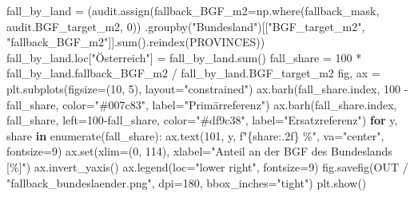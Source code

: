 \documentclass[
  ngerman,
  a4paper,
  DIV=11]{scrreprt}
\newenvironment{Shaded}{\begin{snugshade}}{\end{snugshade}}
\newcommand{\BuiltInTok}[1]{\textcolor[rgb]{0.00,0.23,0.31}{#1}}
\newcommand{\ControlFlowTok}[1]{\textcolor[rgb]{0.00,0.23,0.31}{\textbf{#1}}}
\newcommand{\DecValTok}[1]{\textcolor[rgb]{0.68,0.00,0.00}{#1}}
\newcommand{\KeywordTok}[1]{\textcolor[rgb]{0.00,0.23,0.31}{\textbf{#1}}}
\newcommand{\NormalTok}[1]{\textcolor[rgb]{0.00,0.23,0.31}{#1}}
\newcommand{\OperatorTok}[1]{\textcolor[rgb]{0.37,0.37,0.37}{#1}}
\newcommand{\SpecialCharTok}[1]{\textcolor[rgb]{0.37,0.37,0.37}{#1}}
\newcommand{\SpecialStringTok}[1]{\textcolor[rgb]{0.13,0.47,0.30}{#1}}
\newcommand{\StringTok}[1]{\textcolor[rgb]{0.13,0.47,0.30}{#1}}
\begin{document}
\begin{Shaded}
\begin{Highlighting}[]
\NormalTok{fall\_by\_land }\OperatorTok{=}\NormalTok{ (audit.assign(fallback\_BGF\_m2}\OperatorTok{=}\NormalTok{np.where(fallback\_mask, audit.BGF\_target\_m2, }\DecValTok{0}\NormalTok{))}
\NormalTok{    .groupby(}\StringTok{"Bundesland"}\NormalTok{)[[}\StringTok{"BGF\_target\_m2"}\NormalTok{, }\StringTok{"fallback\_BGF\_m2"}\NormalTok{]].}\BuiltInTok{sum}\NormalTok{().reindex(PROVINCES))}
\NormalTok{fall\_by\_land.loc[}\StringTok{"Österreich"}\NormalTok{] }\OperatorTok{=}\NormalTok{ fall\_by\_land.}\BuiltInTok{sum}\NormalTok{()}
\NormalTok{fall\_share }\OperatorTok{=} \DecValTok{100} \OperatorTok{*}\NormalTok{ fall\_by\_land.fallback\_BGF\_m2 }\OperatorTok{/}\NormalTok{ fall\_by\_land.BGF\_target\_m2}
\NormalTok{fig, ax }\OperatorTok{=}\NormalTok{ plt.subplots(figsize}\OperatorTok{=}\NormalTok{(}\DecValTok{10}\NormalTok{, }\DecValTok{5}\NormalTok{), layout}\OperatorTok{=}\StringTok{"constrained"}\NormalTok{)}
\NormalTok{ax.barh(fall\_share.index, }\DecValTok{100} \OperatorTok{{-}}\NormalTok{ fall\_share, color}\OperatorTok{=}\StringTok{"\#007c83"}\NormalTok{, label}\OperatorTok{=}\StringTok{"Primärreferenz"}\NormalTok{)}
\NormalTok{ax.barh(fall\_share.index, fall\_share, left}\OperatorTok{=}\DecValTok{100}\OperatorTok{{-}}\NormalTok{fall\_share,}
\NormalTok{        color}\OperatorTok{=}\StringTok{"\#df9c38"}\NormalTok{, label}\OperatorTok{=}\StringTok{"Ersatzreferenz"}\NormalTok{)}
\ControlFlowTok{for}\NormalTok{ y, share }\KeywordTok{in} \BuiltInTok{enumerate}\NormalTok{(fall\_share):}
\NormalTok{    ax.text(}\DecValTok{101}\NormalTok{, y, }\SpecialStringTok{f"}\SpecialCharTok{\{}\NormalTok{share}\SpecialCharTok{:.2f\}}\SpecialStringTok{ \%"}\NormalTok{, va}\OperatorTok{=}\StringTok{"center"}\NormalTok{, fontsize}\OperatorTok{=}\DecValTok{9}\NormalTok{)}
\NormalTok{ax.}\BuiltInTok{set}\NormalTok{(xlim}\OperatorTok{=}\NormalTok{(}\DecValTok{0}\NormalTok{, }\DecValTok{114}\NormalTok{), xlabel}\OperatorTok{=}\StringTok{"Anteil an der BGF des Bundeslands [\%]"}\NormalTok{)}
\NormalTok{ax.invert\_yaxis()}
\NormalTok{ax.legend(loc}\OperatorTok{=}\StringTok{"lower right"}\NormalTok{, fontsize}\OperatorTok{=}\DecValTok{9}\NormalTok{)}
\NormalTok{fig.savefig(OUT }\OperatorTok{/} \StringTok{"fallback\_bundeslaender.png"}\NormalTok{, dpi}\OperatorTok{=}\DecValTok{180}\NormalTok{, bbox\_inches}\OperatorTok{=}\StringTok{"tight"}\NormalTok{)}
\NormalTok{plt.show()}
\end{Highlighting}
\end{Shaded}
\end{document}
